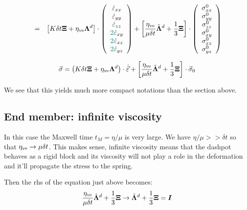 \begin{eqnarray}
&=& 
\left[
K \delta t {\bm \Xi}
+
\eta_{\rm ve} {\bm \Lambda}^d
\right]
\cdot
\left(
\begin{array}{c}
\dot\varepsilon_{xx}\\ 
\dot\varepsilon_{yy}\\ 
\dot\varepsilon_{zz}\\ 
{\color{teal}2}\dot\varepsilon_{xy} \\ 
{\color{teal}2}\dot\varepsilon_{xz} \\ 
{\color{teal}2}\dot\varepsilon_{yz}
\end{array}
\right) 
+ 
\left[
\frac{\eta_{\rm ve}}{\mu\delta t}
\tilde{\bm\Lambda}^d
+
\frac13 {\bm \Xi}
\right]
\cdot
\left(
\begin{array}{c}
\sigma_{xx}^0\\ 
\sigma_{yy}^0\\ 
\sigma_{zz}^0\\ 
\sigma_{xy}^0 \\
\sigma_{xz}^0 \\
\sigma_{yz}^0
\end{array}
\right) 
\label{simpson3D_b}
\end{eqnarray}







\begin{mdframed}[backgroundcolor=blue!5]
\[
\vec\sigma = 
\left(
K \delta t {\bm \Xi}
+
\eta_{\rm ve} {\bm \Lambda}^d
\right)
\cdot
\dot{\vec{\varepsilon}}
+
\left[
\frac{\eta_{\rm ve}}{\mu\delta t}
\tilde{\bm\Lambda}^d
+
\frac13 {\bm \Xi}
\right]
\cdot
\vec\sigma_0
\]
\end{mdframed}

We see that this yields much more compact notations
than the section above.



\subsection{End member: infinite viscosity}
In this case the Maxwell time $t_M=\eta/\mu$ is very large.
We have $\eta/\mu >> \delta t$ so that $\eta_{\rm ve} 
\rightarrow \mu \delta t$. This makes sense, infinite 
viscosity means that the dashpot behaves as a rigid block 
and its viscosity will not play a role in the deformation
and it'll propagate the stress to the spring.

Then the rhs of the equation just above becomes: 
\[
\frac{\eta_{\rm ve}}{\mu \delta t} \tilde{\bm\Lambda}^d + 
\frac13 {\bm\Xi} 
\rightarrow
\tilde{\bm\Lambda}^d + 
\frac13 {\bm\Xi} 
=
{\bm I}
\]

